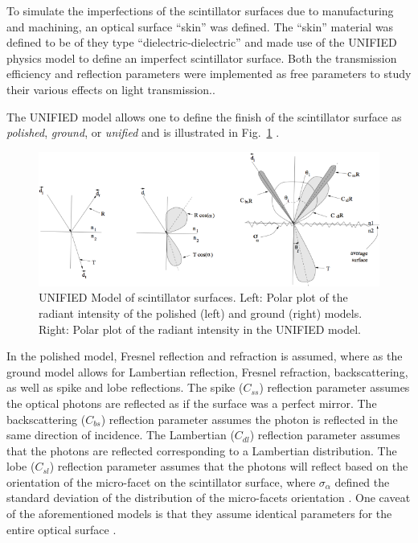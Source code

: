 To simulate the imperfections of the scintillator surfaces due to manufacturing and machining, an optical surface ``skin'' was defined.  The ``skin'' material was defined to be of they type ``dielectric-dielectric'' and made use of the UNIFIED physics model \cite{scint_surface_sim} to define an imperfect scintillator surface.  Both the transmission efficiency and reflection parameters were implemented as free parameters to study their various effects on light transmission..  

The UNIFIED model allows one to define the finish of the scintillator surface as \textit{polished}, \textit{ground}, or \textit{unified} and is illustrated in Fig.~\ref{fig:polished_vs_ground} \cite{scint_surface_sim}.
	\begin{figure}[tbph]
	\centering
	\includegraphics[width=1.0\columnwidth]{simulation/figs/polished_vs_ground}
	\caption{UNIFIED Model of scintillator surfaces.  Left: Polar plot of the radiant intensity of the polished (left) and ground (right) models.  Right: Polar plot of the radiant intensity in the UNIFIED model.}
	\label{fig:polished_vs_ground}
	\end{figure}

In the polished model, Fresnel reflection and refraction is assumed, where as the ground model allows for Lambertian reflection, Fresnel refraction, backscattering, as well as spike and lobe reflections.  The spike ($C_{ss}$) reflection parameter assumes the optical photons are reflected as if the surface was a perfect mirror.  The backscattering ($C_{bs}$) reflection parameter assumes the photon is reflected in the same direction of incidence.  The Lambertian ($C_{dl}$) reflection parameter assumes that the photons are reflected corresponding to a Lambertian distribution.  The lobe ($C_{sl}$) reflection parameter assumes that the photons will reflect based on the orientation of the micro-facet on the scintillator surface, where $\sigma_{\alpha}$ defined the standard deviation of the distribution of the micro-facets orientation \cite{scint_surface_sim}.  One caveat of the aforementioned models is that they assume identical parameters for the entire optical surface \cite{puneet_sim_wiki}.


